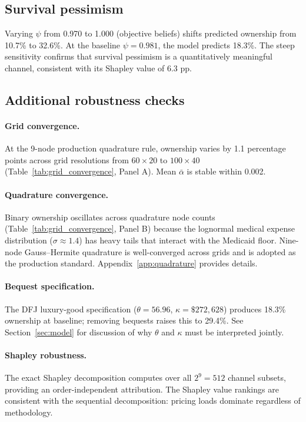 \documentclass[12pt]{article}
\begin{document}
\subsection{Survival pessimism}

Varying $\psi$ from 0.970 to 1.000 (objective beliefs) shifts predicted ownership from 10.7\% to 32.6\%. At the baseline $\psi = 0.981$, the model predicts 18.3\%. The steep sensitivity confirms that survival pessimism is a quantitatively meaningful channel, consistent with its Shapley value of 6.3 pp.

\subsection{Additional robustness checks}

\paragraph{Grid convergence.} At the 9-node production quadrature rule, ownership varies by 1.1 percentage points across grid resolutions from $60 \times 20$ to $100 \times 40$ (Table~\ref{tab:grid_convergence}, Panel A). Mean $\bar{\alpha}$ is stable within 0.002.

\paragraph{Quadrature convergence.} Binary ownership oscillates across quadrature node counts (Table~\ref{tab:grid_convergence}, Panel B) because the lognormal medical expense distribution ($\sigma \approx 1.4$) has heavy tails that interact with the Medicaid floor. Nine-node Gauss--Hermite quadrature is well-converged across grids and is adopted as the production standard. Appendix~\ref{app:quadrature} provides details.

\paragraph{Bequest specification.} The DFJ luxury-good specification ($\theta = 56.96$, $\kappa = \$272{,}628$) produces 18.3\% ownership at baseline; removing bequests raises this to 29.4\%. See Section~\ref{sec:model} for discussion of why $\theta$ and $\kappa$ must be interpreted jointly.

\paragraph{Shapley robustness.} The exact Shapley decomposition computes over all $2^9 = 512$ channel subsets, providing an order-independent attribution. The Shapley value rankings are consistent with the sequential decomposition: pricing loads dominate regardless of methodology.
\end{document}

